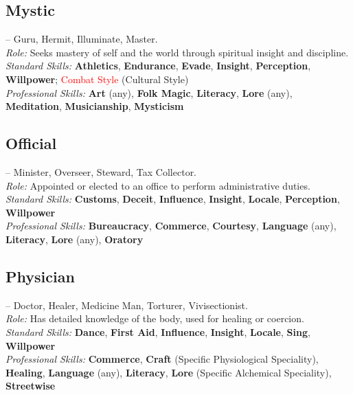 \documentclass[10pt]{article}
\newcommand{\skill}[1]{\textbf{#1}}
\begin{document}
\vspace{0.2cm}
\subsection*{Mystic}
\label{career:mystic}
 -- Guru, Hermit, Illuminate, Master.\\
\textit{Role:} Seeks mastery of self and the world through spiritual insight and discipline.\\
\textit{Standard Skills:} \skill{Athletics}, \skill{Endurance}, \skill{Evade}, \skill{Insight}, \skill{Perception}, \skill{Willpower}; \textcolor{red}{Combat Style} (Cultural Style)\\
\textit{Professional Skills:} \skill{Art} (any), \skill{Folk Magic}, \skill{Literacy}, \skill{Lore} (any), \skill{Meditation}, \skill{Musicianship}, \skill{Mysticism}

\vspace{0.2cm}
\subsection*{Official}
\label{career:official}
 -- Minister, Overseer, Steward, Tax Collector.\\
\textit{Role:} Appointed or elected to an office to perform administrative duties.\\
\textit{Standard Skills:} \skill{Customs}, \skill{Deceit}, \skill{Influence}, \skill{Insight}, \skill{Locale}, \skill{Perception}, \skill{Willpower}\\
\textit{Professional Skills:} \skill{Bureaucracy}, \skill{Commerce}, \skill{Courtesy}, \skill{Language} (any), \skill{Literacy}, \skill{Lore} (any), \skill{Oratory}

\vspace{0.2cm}
\subsection*{Physician}
\label{career:physician}
 -- Doctor, Healer, Medicine Man, Torturer, Vivisectionist.\\
\textit{Role:} Has detailed knowledge of the body, used for healing or coercion.\\
\textit{Standard Skills:} \skill{Dance}, \skill{First Aid}, \skill{Influence}, \skill{Insight}, \skill{Locale}, \skill{Sing}, \skill{Willpower}\\
\textit{Professional Skills:} \skill{Commerce}, \skill{Craft} (Specific Physiological Speciality), \skill{Healing}, \skill{Language} (any), \skill{Literacy}, \skill{Lore} (Specific Alchemical Speciality), \skill{Streetwise}
\end{document}

